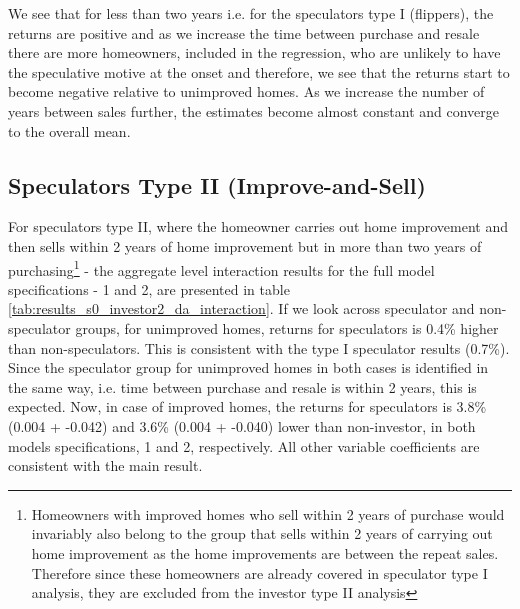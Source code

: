 \documentclass[AEJ,reqno, draftmode]{AEA} %
\begin{document}
We see that for less than two years i.e. for the speculators type I (flippers), the returns are positive and as we increase the time between purchase and resale there are more homeowners, included in the regression, who are unlikely to have the speculative motive at the onset and therefore, we see that the returns start to become negative relative to unimproved homes. As we increase the number of years between sales further, the estimates become almost constant and converge to the overall mean. 


\subsection{Speculators Type II (Improve-and-Sell)}



For speculators type II, where the homeowner carries out home improvement and then sells within 2 years of home improvement but in more than two years of purchasing\footnote{Homeowners with improved homes who sell within 2 years of purchase would invariably also belong to the group that sells within 2 years of carrying out home improvement as the home improvements are between the repeat sales. Therefore since these homeowners are already covered in speculator type I analysis, they are excluded from the investor type II analysis} - the aggregate level interaction results for the full model specifications - 1 and 2, are presented in table \ref{tab:results_s0_investor2_da_interaction}. 
If we look across speculator and non-speculator groups, for unimproved homes, returns for speculators is 0.4\% higher than non-speculators. This is consistent with the type I speculator results (0.7\%). Since the speculator group for unimproved homes in both cases is identified in the same way, i.e. time between purchase and resale is within 2 years, this is expected. Now, in case of improved homes, the returns for speculators is 3.8\% (0.004 + -0.042) and 3.6\% (0.004 + -0.040) lower than non-investor, in both models specifications, 1 and 2, respectively. All other variable coefficients are consistent with the main result.
\end{document}
